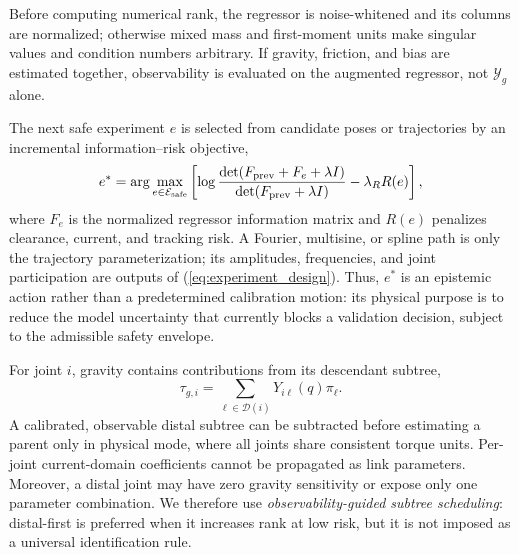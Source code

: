 \documentclass[conference]{IEEEtran}
\begin{document}
Before computing numerical rank, the regressor is noise-whitened and its
columns are normalized; otherwise mixed mass and first-moment units make
singular values and condition numbers arbitrary. If gravity, friction, and bias
are estimated together, observability is evaluated on the augmented regressor,
not $\mathcal Y_g$ alone.

The next safe experiment $e$ is selected from candidate poses or trajectories
by an incremental information--risk objective,
\begin{equation}
 e^*=\arg\max_{e\in\mathcal E_{\rm safe}}
 \left[\log\frac{\det(F_{\rm prev}+F_e+\lambda I)}
 {\det(F_{\rm prev}+\lambda I)}-\lambda_R R(e)\right],
 \label{eq:experiment_design}
\end{equation}
where $F_e$ is the normalized regressor information matrix and $R(e)$ penalizes
clearance, current, and tracking risk. A Fourier, multisine, or spline path is
only the trajectory parameterization; its amplitudes, frequencies, and joint
participation are outputs of (\ref{eq:experiment_design}).
Thus, $e^*$ is an epistemic action rather than a predetermined calibration
motion: its physical purpose is to reduce the model uncertainty that currently
blocks a validation decision, subject to the admissible safety envelope.

For joint $i$, gravity contains contributions from its descendant subtree,
\begin{equation}
 \tau_{g,i}=\sum_{\ell\in\mathcal D(i)}Y_{i\ell}(q)\pi_\ell.
 \label{eq:subtree}
\end{equation}
A calibrated, observable distal subtree can be subtracted before estimating a
parent only in physical mode, where all joints share consistent torque units.
Per-joint current-domain coefficients cannot be propagated as link parameters.
Moreover, a distal joint may have zero gravity sensitivity or expose only one
parameter combination. We therefore use \emph{observability-guided
subtree scheduling}: distal-first is preferred when it increases rank at low
risk, but it is not imposed as a universal identification rule.
\end{document}
